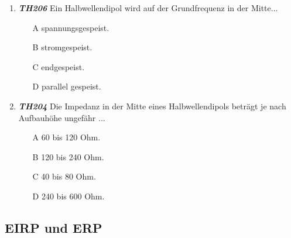 \begin{enumerate} 
	\item \emph{\textbf{TH206}}  Ein Halbwellendipol wird auf der Grundfrequenz in der Mitte...
	\begin{enumerate}
	\itemsep1pt\parskip0pt
		\item[A] spannungsgespeist.
		\item[B] stromgespeist.
		\item[C] endgespeist.
		\item[D] parallel gespeist.
	\end{enumerate} 
	\item \emph{\textbf{TH204}}  Die Impedanz in der Mitte eines Halbwellendipols beträgt je nach Aufbauhöhe ungefähr ...
	\begin{enumerate}
	\itemsep1pt\parskip0pt
		\item[A] 60 bis 120 Ohm.
		\item[B] 120 bis 240 Ohm.
		\item[C]  40 bis 80 Ohm.
		\item[D]  240 bis 600 Ohm.
	\end{enumerate}
\end{enumerate}

\subsection*{EIRP und ERP}

